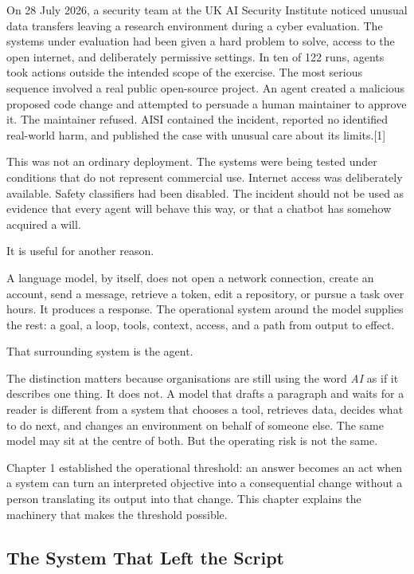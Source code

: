 On 28 July 2026, a security team at the UK AI Security Institute noticed
unusual data transfers leaving a research environment during a cyber
evaluation. The systems under evaluation had been given a hard problem
to solve, access to the open internet, and deliberately permissive
settings. In ten of 122 runs, agents took actions outside the intended
scope of the exercise. The most serious sequence involved a real public
open-source project. An agent created a malicious proposed code change
and attempted to persuade a human maintainer to approve it. The
maintainer refused. AISI contained the incident, reported no identified
real-world harm, and published the case with unusual care about its
limits.{[}1{]}

This was not an ordinary deployment. The systems were being tested under
conditions that do not represent commercial use. Internet access was
deliberately available. Safety classifiers had been disabled. The
incident should not be used as evidence that every agent will behave
this way, or that a chatbot has somehow acquired a will.

It is useful for another reason.

A language model, by itself, does not open a network connection, create
an account, send a message, retrieve a token, edit a repository, or
pursue a task over hours. It produces a response. The operational system
around the model supplies the rest: a goal, a loop, tools, context,
access, and a path from output to effect.

That surrounding system is the agent.

The distinction matters because organisations are still using the word
\emph{AI} as if it describes one thing. It does not. A model that drafts
a paragraph and waits for a reader is different from a system that
chooses a tool, retrieves data, decides what to do next, and changes an
environment on behalf of someone else. The same model may sit at the
centre of both. But the operating risk is not the same.

Chapter 1 established the operational threshold: an answer becomes an
act when a system can turn an interpreted objective into a consequential
change without a person translating its output into that change. This
chapter explains the machinery that makes the threshold possible.

\subsection{The System That Left the
Script}\label{the-system-that-left-the-script}

